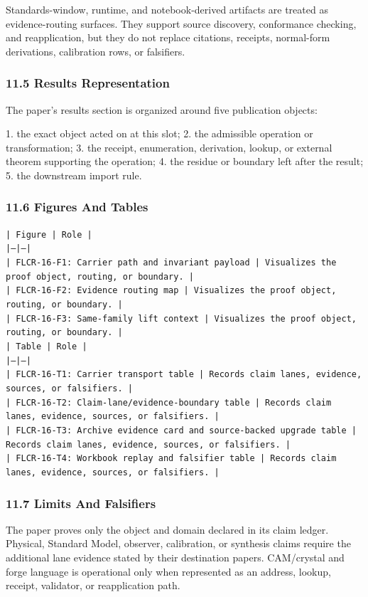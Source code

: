 \documentclass[11pt]{article}
\begin{document}
Standards-window, runtime, and notebook-derived artifacts are treated
as evidence-routing surfaces. They support source discovery, conformance
checking, and reapplication, but they do not replace citations, receipts,
normal-form derivations, calibration rows, or falsifiers.

\subsubsection*{11.5 Results Representation}

The paper's results section is organized around five publication objects:

1. the exact object acted on at this slot;
2. the admissible operation or transformation;
3. the receipt, enumeration, derivation, lookup, or external theorem supporting
   the operation;
4. the residue or boundary left after the result;
5. the downstream import rule.

\subsubsection*{11.6 Figures And Tables}

\noindent\texttt{| Figure | Role |}\\
\noindent\texttt{|---|---|}\\
\noindent\texttt{| FLCR-16-F1: Carrier path and invariant payload | Visualizes the proof object, routing, or boundary. |}\\
\noindent\texttt{| FLCR-16-F2: Evidence routing map | Visualizes the proof object, routing, or boundary. |}\\
\noindent\texttt{| FLCR-16-F3: Same-family lift context | Visualizes the proof object, routing, or boundary. |}\\

\noindent\texttt{| Table | Role |}\\
\noindent\texttt{|---|---|}\\
\noindent\texttt{| FLCR-16-T1: Carrier transport table | Records claim lanes, evidence, sources, or falsifiers. |}\\
\noindent\texttt{| FLCR-16-T2: Claim-lane/evidence-boundary table | Records claim lanes, evidence, sources, or falsifiers. |}\\
\noindent\texttt{| FLCR-16-T3: Archive evidence card and source-backed upgrade table | Records claim lanes, evidence, sources, or falsifiers. |}\\
\noindent\texttt{| FLCR-16-T4: Workbook replay and falsifier table | Records claim lanes, evidence, sources, or falsifiers. |}\\

\subsubsection*{11.7 Limits And Falsifiers}

The paper proves only the object and domain declared in its claim ledger.
Physical, Standard Model, observer, calibration, or synthesis claims require
the additional lane evidence stated by their destination papers. CAM/crystal
and forge language is operational only when represented as an address, lookup,
receipt, validator, or reapplication path.
\end{document}
